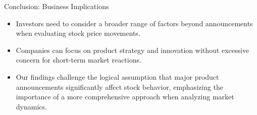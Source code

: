 \documentclass{beamer}
\begin{document}
\begin{frame}{Conclusion: Business Implications}
  \begin{itemize}
    \item  Investors need to consider a broader range of factors beyond announcements when evaluating stock price movements.
    \item Companies can focus on product strategy and innovation without excessive concern for short-term market reactions.
    \item Our findings challenge the logical assumption that major product announcements significantly affect stock behavior, emphasizing the importance of a more comprehensive approach when analyzing market dynamics.
  \end{itemize}
\end{frame}
\end{document}
